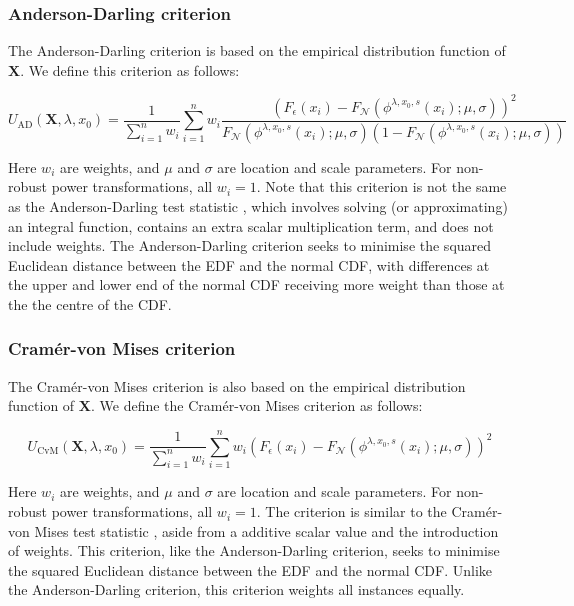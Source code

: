 \documentclass[preprint,12pt,authoryear]{elsarticle}
\begin{document}
\subsubsection{Anderson-Darling
criterion}\label{anderson-darling-criterion}

The Anderson-Darling criterion is based on the empirical distribution
function of \(\mathbf{X}\). We define this criterion as follows:

\begin{equation}
U_{\text{AD}} \left(\mathbf{X}, \lambda, x_0 \right) = \frac{1}{\sum_{i=1}^n w_i} \sum_{i=1}^n w_i \frac{\left( F_{\epsilon}\left(x_i \right) - F_{\mathcal{N}} \left(\phi^{\lambda, x_0, s} \left(x_i \right); \mu, \sigma \right) \right)^2} {F_{\mathcal{N}} \left(\phi^{\lambda, x_0, s} \left(x_i \right); \mu, \sigma \right) \left(1 - F_{\mathcal{N}} \left(\phi^{\lambda, x_0, s} \left(x_i \right); \mu, \sigma \right) \right) }
\end{equation}

Here \(w_i\) are weights, and \(\mu\) and \(\sigma\) are location and
scale parameters. For non-robust power transformations, all \(w_i = 1\).
Note that this criterion is not the same as the Anderson-Darling test
statistic \citep{Anderson1952-gz}, which involves solving (or
approximating) an integral function, contains an extra scalar
multiplication term, and does not include weights. The Anderson-Darling
criterion seeks to minimise the squared Euclidean distance between the
EDF and the normal CDF, with differences at the upper and lower end of
the normal CDF receiving more weight than those at the the centre of the
CDF.

\subsubsection{Cramér-von Mises
criterion}\label{cramuxe9r-von-mises-criterion}

The Cramér-von Mises criterion is also based on the empirical
distribution function of \(\mathbf{X}\). We define the Cramér-von Mises
criterion as follows:

\begin{equation}
U_{\text{CvM}} \left(\mathbf{X}, \lambda, x_0 \right) = \frac{1}{\sum_{i=1}^n w_i} \sum_{i=1}^n w_i \left( F_{\epsilon}\left(x_i \right) - F_{\mathcal{N}} \left(\phi^{\lambda, x_0, s} \left(x_i \right); \mu, \sigma \right) \right)^2
\end{equation}

Here \(w_i\) are weights, and \(\mu\) and \(\sigma\) are location and
scale parameters. For non-robust power transformations, all \(w_i = 1\).
The criterion is similar to the Cramér-von Mises test statistic \citep{Cramer1928-rc, Von_Mises1928-ef},
aside from a additive scalar value and the introduction of
weights. This criterion, like the Anderson-Darling criterion, seeks to
minimise the squared Euclidean distance between the EDF and the normal
CDF. Unlike the Anderson-Darling criterion, this criterion weights all
instances equally.
\end{document}
